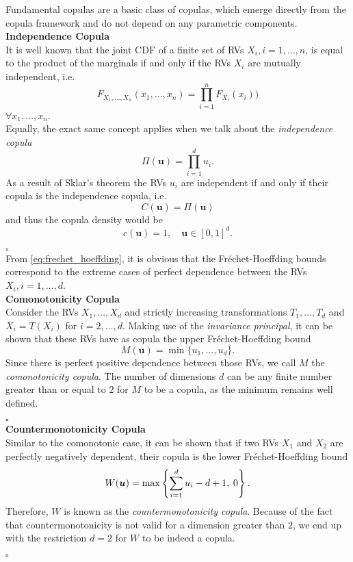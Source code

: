 
Fundamental copulas are a basic class of copulas, which emerge directly from the copula framework and do not depend on any parametric components. \\

\textbf{Independence Copula}\\
It is well known that the joint \ac{CDF} of a finite set of \acp{RV}
$X_i, i = 1, \ldots, n$, is equal to the product of the marginals if and only if the \acp{RV} $X_i$ are mutually independent, i.e.
$$
F_{X_{1}, \ldots, X_{n}}\left(x_{1}, \ldots, x_{n}\right)= \prod_{i=1}^{n} F_{X_{i}}\left(x_{i}\right)) 
$$
$\forall x_1, \ldots, x_n$.\\
Equally, the exact same concept applies when we talk about the \textit{independence copula}
\begin{equation}
\Pi (\bm{u}) = \prod \limits _{i = 1}^d u_i.
\end{equation}
As a result of Sklar's theorem the \ac{RV}s $u_i$ are independent if and only if their copula is the independence copula, i.e.
$$ C(\bm{u}) = \Pi (\bm{u}) $$
and thus the copula density would be 
$$c(\boldsymbol{u})=1, \quad \boldsymbol{u} \in[0,1]^{d}.$$

\hfill $\square$ \\


From \autoref{eq:frechet_hoeffding}, it is obvious that the Fr\'echet-Hoeffding bounds correspond to the extreme cases of perfect dependence between the \ac{RV}s $X_i, i = 1, \ldots, d$. \\

\textbf{Comonotonicity Copula}\\
Consider the \ac{RV}s $X_1, \ldots, X_d$ and strictly increasing transformations $T_1, \ldots, T_d$ and $X_i = T(X_i)$ for $i = 2, \ldots, d$. Making use of the \textit{invariance principal}, it can be shown that these \ac{RV}s have as copula the upper Fr\'echet-Hoeffding bound 
$$M(\bm{u}) = \min\{ u_1, \ldots, u_d \}.$$ Since there is perfect positive dependence between those \ac{RV}s, we call $M$ the \textit{comonotonicity copula}. The number of dimensions $d$ can be any finite number greater than or equal to $2$ for $M$ to be a copula, as the minimum remains well defined.

\hfill $\square$ \\



\textbf{Countermonotonicity Copula}\\
Similar to the comonotonic case, it can be shown that if two \acp{RV} $X_1$ and $X_2$ are perfectly negatively dependent, their copula is the lower Fr\'echet-Hoeffding bound
$$
W(\boldsymbol{u})=\max \left\{\sum\limits_{i=1}^{d} u_{i}-d+1, \hspace{0.25em} 0\right\}.
$$
Therefore, $W$ is known as the \textit{countermonotonicity copula}. Because of the fact that countermonotonicity is not valid for a dimension greater than $2$, we end up with the restriction $d=2$ for $W$ to be indeed a copula.

\hfill $\square$ \\








